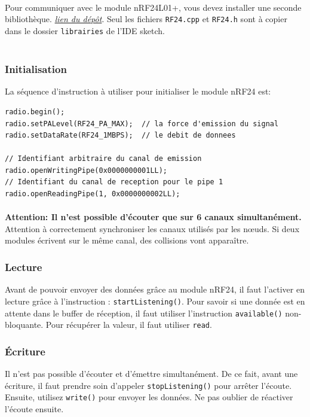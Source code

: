 \documentclass[a4paper, titlepage, oneside, 12pt]{article}%
\begin{document}
\paragraph{}
Pour communiquer avec le module nRF24L01+, vous devez installer une seconde bibliothèque.
\href{https://github.com/stanleyseow/RF24}{\textit{lien du dépôt}}. Seul les fichiers \texttt{RF24.cpp} et \texttt{RF24.h} sont à copier dans le dossier \texttt{librairies} de l'IDE sketch.
\\ \\
\subsubsection{Initialisation}
La séquence d'instruction à utiliser pour initialiser le module nRF24 est:\\

\begin{lstlisting}
radio.begin();
radio.setPALevel(RF24_PA_MAX);	// la force d'emission du signal
radio.setDataRate(RF24_1MBPS);	// le debit de donnees

// Identifiant arbitraire du canal de emission 
radio.openWritingPipe(0x0000000001LL);
// Identifiant du canal de reception pour le pipe 1
radio.openReadingPipe(1, 0x0000000002LL);
\end{lstlisting}
\paragraph{}
\textbf{Attention: Il n'est possible d’écouter que sur 6 canaux simultanément.\\}
Attention à correctement synchroniser les canaux utilisés par les nœuds. Si deux modules écrivent sur le même canal, des collisions vont apparaître.

\subsubsection{Lecture}
Avant de pouvoir envoyer des données grâce au module nRF24, il faut l'activer en lecture grâce à l'instruction : \texttt{startListening()}.
Pour savoir si une donnée est en attente dans le buffer de réception, il faut utiliser l'instruction \texttt{available()} non-bloquante.
Pour récupérer la valeur, il faut utiliser \texttt{read}.

\subsubsection{Écriture}
Il n'est pas possible d'écouter et d'émettre simultanément. De ce fait, avant une écriture, il faut prendre soin d'appeler \texttt{stopListening()} pour arrêter l'écoute. Ensuite, utilisez \texttt{write()} pour envoyer les données.
Ne pas oublier de réactiver l'écoute ensuite.
\end{document}
